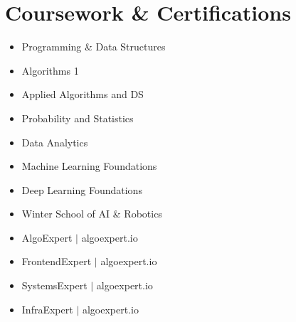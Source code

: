\documentclass[letterpaper,11pt]{article}
\begin{document}
\section{Coursework \& Certifications}
        \begin{multicols}{3}
            \begin{itemize}[itemsep=-2pt, parsep=3pt]
                \item Programming \& Data Structures
                \item Algorithms 1
                \item Applied Algorithms and DS
                \item Probability and Statistics
                \item Data Analytics
                \item Machine Learning Foundations
                \item Deep Learning Foundations
                \item Winter School of AI \& Robotics
                \item AlgoExpert $|$ algoexpert.io
                \item FrontendExpert $|$ algoexpert.io
                \item SystemsExpert $|$ algoexpert.io
                \item InfraExpert $|$ algoexpert.io
            \end{itemize}
        \end{multicols}
\end{document}
